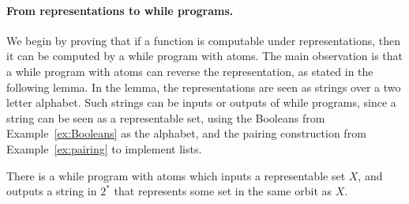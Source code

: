 \paragraph*{From representations to while programs.} We begin by proving that if a function is computable  under representations, then it can be computed by a while program with atoms.  The main observation is that a while program with atoms can reverse the representation, as stated in the following lemma. In the lemma, the representations are seen as strings over a two letter alphabet. Such strings can be inputs or outputs of while programs, since a string can be seen as a representable set, using the Booleans from Example~\ref{ex:Booleans} as the alphabet, and the  pairing construction from Example~\ref{ex:pairing} to implement lists.	

\begin{lemma}
	There is a while program with atoms which inputs a representable set $X$, and outputs a  string in  $ 2^*$ that represents some  set in the same orbit as $X$.
\end{lemma}
